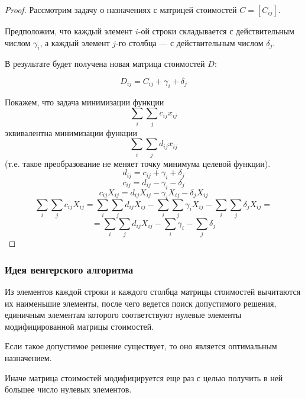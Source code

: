 \documentclass[17pt]{extarticle}
\begin{document}
\begin{proof}
    Рассмотрим задачу о назначениях с матрицей стоимостей \( C = [C_{ij}] \).

    Предположим, что каждый элемент \( i \)-ой строки складывается с действительным числом \( \gamma_i \), а каждый элемент \( j \)-го столбца — с действительным числом \( \delta_j \).

    В результате будет получена новая матрица стоимостей \( D \):

    \[
        D_{ij} = C_{ij} + \gamma_i + \delta_j
    \]

    Покажем, что задача минимизации функции
    \[
        \sum_i \sum_j c_{ij} x_{ij}
    \]
    эквивалентна минимизации функции
    \[
        \sum_i \sum_j d_{ij} x_{ij}
    \]
    (т.е. такое преобразование не меняет точку минимума целевой функции).
    \[
        d_{ij} = c_{ij} + \gamma_i + \delta_j
    \]
    \[
        c_{ij} = d_{ij} - \gamma_i - \delta_j
    \]
    \[
        c_{ij}X_{ij} = d_{ij}X_{ij} - \gamma_i X_{ij} - \delta_j X_{ij}
    \]
    \[
        \sum_i \sum_j c_{ij}X_{ij} = \sum_i \sum_j d_{ij}X_{ij} - \sum_i \sum_j \gamma_i X_{ij} - \sum_i \sum_j \delta_j X_{ij} =
    \]
    \[
        = \sum_i \sum_j d_{ij}X_{ij} - \sum_i \gamma_i - \sum_j \delta_j
    \]
\end{proof}

\subsubsection{Идея венгерского алгоритма}

Из элементов каждой строки и каждого столбца матрицы
стоимостей вычитаются их наименьшие элементы, после чего
ведется поиск допустимого решения, единичным элементам
которого соответствуют нулевые элементы
модифицированной матрицы стоимостей.

Если такое допустимое решение существует, то оно является
оптимальным назначением.

Иначе матрица стоимостей модифицируется еще раз с целью
получить в ней большее число нулевых элементов.
\end{document}
